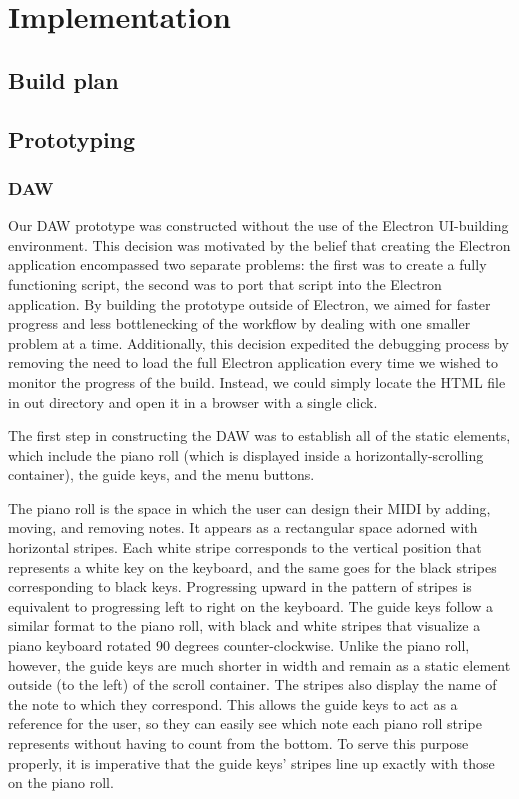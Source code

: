 \section{Implementation}

\subsection{Build plan}

\blindtext

\subsection{Prototyping}

\subsubsection{DAW}

Our DAW prototype was constructed without the use of the Electron UI-building environment. This
decision was motivated by the belief that creating the Electron application encompassed two
separate problems: the first was to create a fully functioning script, the second was to port that
script into the Electron application. By building the prototype outside of Electron, we aimed for
faster progress and less bottlenecking of the workflow by dealing with one smaller problem at a
time. Additionally, this decision expedited the debugging process by removing the need to load
the full Electron application every time we wished to monitor the progress of the build. Instead,
we could simply locate the HTML file in out directory and open it in a browser with a single click.

The first step in constructing the DAW was to establish all of the static elements, which include
the piano roll (which is displayed inside a horizontally-scrolling container), the guide keys, and
the menu buttons.

The piano roll is the space in which the user can design their MIDI by adding,
moving, and removing notes. It appears as a rectangular space adorned with horizontal stripes. Each
white stripe corresponds to the vertical position that represents a white key on the keyboard, and
the same goes for the black stripes corresponding to black keys. Progressing upward in the pattern
of stripes is equivalent to progressing left to right on the keyboard. The guide keys follow a
similar format to the piano roll, with black and white stripes that visualize a piano keyboard
rotated 90 degrees counter-clockwise. Unlike the piano roll, however, the guide keys are much
shorter in width and remain as a static element outside (to the left) of the scroll container.
The stripes also display the name of the note to which they correspond. This allows the guide keys
to act as a reference for the user, so they can easily see which note each piano roll stripe
represents without having to count from the bottom. To serve this purpose properly, it is
imperative that the guide keys' stripes line up exactly with those on the piano roll.

